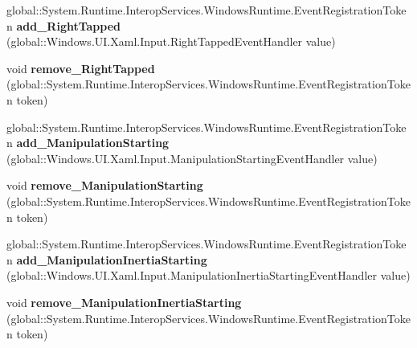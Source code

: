 \begin{DoxyCompactItemize}
global\+::\+System.\+Runtime.\+Interop\+Services.\+Windows\+Runtime.\+Event\+Registration\+Token {\bfseries add\+\_\+\+Right\+Tapped} (global\+::\+Windows.\+U\+I.\+Xaml.\+Input.\+Right\+Tapped\+Event\+Handler value)
\item 
\mbox{\label{interface_windows_1_1_u_i_1_1_xaml_1_1_i_u_i_element_a3582ef21b0d8aa47e220b343772155be}} 
void {\bfseries remove\+\_\+\+Right\+Tapped} (global\+::\+System.\+Runtime.\+Interop\+Services.\+Windows\+Runtime.\+Event\+Registration\+Token token)
\item 
\mbox{\label{interface_windows_1_1_u_i_1_1_xaml_1_1_i_u_i_element_a893f1fc019c5b01a9edcf81dbae7fb71}} 
global\+::\+System.\+Runtime.\+Interop\+Services.\+Windows\+Runtime.\+Event\+Registration\+Token {\bfseries add\+\_\+\+Manipulation\+Starting} (global\+::\+Windows.\+U\+I.\+Xaml.\+Input.\+Manipulation\+Starting\+Event\+Handler value)
\item 
\mbox{\label{interface_windows_1_1_u_i_1_1_xaml_1_1_i_u_i_element_aacad93dba45c725c051fd835e8599cc8}} 
void {\bfseries remove\+\_\+\+Manipulation\+Starting} (global\+::\+System.\+Runtime.\+Interop\+Services.\+Windows\+Runtime.\+Event\+Registration\+Token token)
\item 
\mbox{\label{interface_windows_1_1_u_i_1_1_xaml_1_1_i_u_i_element_a8b3a684ee7f64d2a3b27633301a58825}} 
global\+::\+System.\+Runtime.\+Interop\+Services.\+Windows\+Runtime.\+Event\+Registration\+Token {\bfseries add\+\_\+\+Manipulation\+Inertia\+Starting} (global\+::\+Windows.\+U\+I.\+Xaml.\+Input.\+Manipulation\+Inertia\+Starting\+Event\+Handler value)
\item 
\mbox{\label{interface_windows_1_1_u_i_1_1_xaml_1_1_i_u_i_element_a45e976afe0af013e41228cbdbdf558d2}} 
void {\bfseries remove\+\_\+\+Manipulation\+Inertia\+Starting} (global\+::\+System.\+Runtime.\+Interop\+Services.\+Windows\+Runtime.\+Event\+Registration\+Token token)
\item 
\mbox{\label{interface_windows_1_1_u_i_1_1_xaml_1_1_i_u_i_element_a0a6629935ddc66f152be79ea1665fe62}} 

\end{DoxyCompactItemize}
